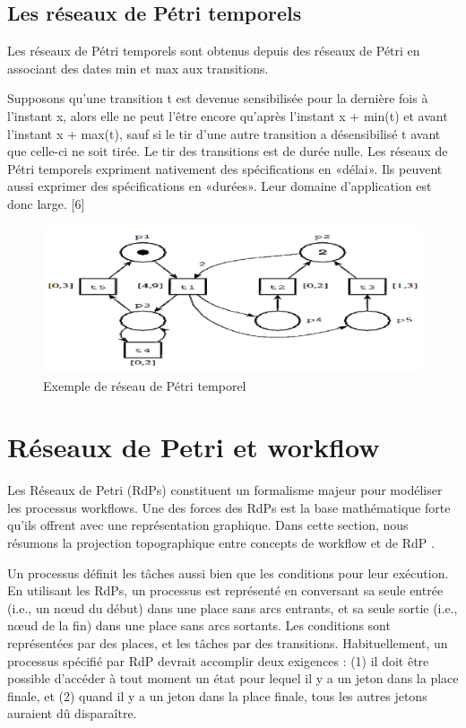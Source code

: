 \subsection{Les réseaux de Pétri temporels }

Les réseaux de Pétri temporels sont obtenus depuis des réseaux de Pétri en associant des dates min et max aux transitions.

 Supposons qu’une transition t est devenue sensibilisée pour la dernière fois à l’instant x, alors elle ne peut l’être encore qu’après l’instant x + min(t) et avant l’instant x + max(t), sauf si le tir d’une autre transition a désensibilisé t avant que celle-ci ne soit tirée. Le tir des transitions est de durée nulle. Les réseaux de Pétri temporels expriment nativement des spécifications en «délai». Ils peuvent aussi exprimer des spécifications en «durées». Leur domaine d’application est donc large. [6]


\begin{figure}[H]
	\centering
	\includegraphics[width=0.7\linewidth]{images/pitrif005}
	\caption{ Exemple de réseau de Pétri temporel }
	\label{fig:pitrif005}
\end{figure}





\section{Réseaux de Petri et workflow
}

Les Réseaux de Petri (RdPs)  constituent un formalisme majeur pour modéliser les processus workflows. Une des forces des RdPs est la base mathématique forte qu'ils offrent avec une représentation graphique. Dans cette section, nous résumons la projection topographique entre concepts de workflow et de RdP  . 

Un processus définit les tâches aussi bien que les conditions pour leur exécution. En utilisant les RdPs, un processus est représenté en conversant sa seule entrée (i.e., un nœud du début) dans une place sans arcs entrants, et sa seule sortie (i.e., nœud de la fin) dans une place sans arcs sortants. Les conditions sont représentées par des places, et les tâches par des transitions. Habituellement, un processus spécifié par RdP devrait accomplir deux exigences : (1) il doit être possible d'accéder à tout moment un état pour lequel il y a un jeton dans la place finale, et (2) quand il y a un jeton dans la place finale, tous les autres jetons auraient dû disparaître.

